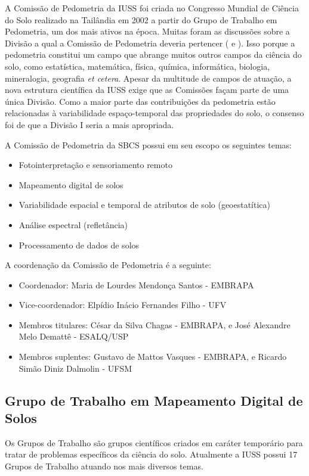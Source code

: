 A Comissão de Pedometria da IUSS foi criada no Congresso Mundial de Ciência do Solo realizado na Tailândia em 2002 a partir do Grupo de Trabalho em Pedometria, um dos mais ativos na época. Muitas foram as discussões sobre a Divisão a qual a Comissão de Pedometria deveria pertencer (\PedometronOnze{} e \PedometronDoze). Isso porque a pedometria constitui um campo que abrange muitos outros campos da ciência do solo, como estatística, matemática, física, química, informática, biologia, mineralogia, geografia \textit{et cetera}. Apesar da multitude de campos de atuação, a nova estrutura científica da IUSS exige que as Comissões façam parte de uma única Divisão. Como a maior parte das contribuições da pedometria estão relacionadas à variabilidade espaço-temporal das propriedades do solo, o consenso foi de que a Divisão I seria a mais apropriada.

A Comissão de Pedometria da SBCS possui em seu escopo os seguintes temas:

\begin{itemize}
 \item Fotointerpretação e sensoriamento remoto
 \item Mapeamento digital de solos
 \item Variabilidade espacial e temporal de atributos de solo (geoestatítica)
 \item Análise espectral (refletância)
 \item Processamento de dados de solos
\end{itemize}

A coordenação da Comissão de Pedometria é a seguinte:

\begin{itemize}
 \item Coordenador: Maria de Lourdes Mendonça Santos - EMBRAPA
 \item Vice-coordenador: Elpídio Inácio Fernandes Filho - UFV
 \item Membros titulares: César da Silva Chagas - EMBRAPA, e José Alexandre Melo Demattê - ESALQ/USP
 \item Membros suplentes: Gustavo de Mattos Vasques - EMBRAPA, e Ricardo Simão Diniz Dalmolin - UFSM
\end{itemize}

\subsection{Grupo de Trabalho em Mapeamento Digital de Solos}

Os Grupos de Trabalho são grupos científicos criados em caráter temporário para tratar de problemas específicos da ciência do solo. Atualmente a IUSS possui 17 Grupos de Trabalho atuando nos mais diversos temas.

